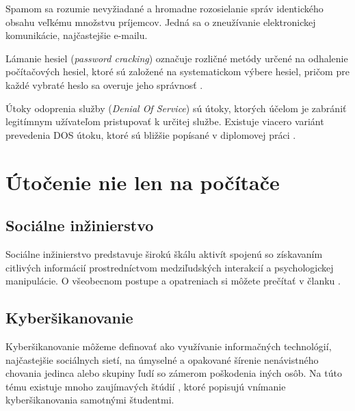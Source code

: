 \documentclass{article}
\begin{document}
Spamom \cite{wiki:Spam} sa rozumie nevyžiadané a hromadne rozosielanie správ identického obsahu veľkému množstvu príjemcov. Jedná sa o zneužívanie elektronickej komunikácie, najčastejšie e-mailu.

Lámanie hesiel (\emph{password cracking}) označuje rozličné metódy určené na odhalenie počítačových hesiel, ktoré sú  založené na systematickom výbere hesiel, pričom pre každé
vybraté heslo sa overuje jeho správnosť \cite{Hranicky2016}.

Útoky odoprenia služby (\emph{Denial Of Service}) sú útoky, ktorých účelom je zabrániť legitímnym užívateľom pristupovať k určitej službe. Existuje viacero variánt prevedenia DOS útoku, ktoré sú bližšie popísané v diplomovej práci \cite{Gerlichy2017}.

\section{Útočenie nie len na počítače}
\subsection{Sociálne inžinierstvo} 
Sociálne inžinierstvo predstavuje širokú škálu aktivít spojenú so získavaním citlivých informácií prostredníctvom medziľudských interakcií a psychologickej manipulácie. O všeobecnom postupe a opatreniach si môžete prečítať v članku \cite{SocialEngineering}.


\subsection{Kyberšikanovanie}
Kyberšikanovanie môžeme definovať \cite{CyberBullying} ako využívanie informačných technológií, najčastejšie sociálnych sietí, na úmyselné a  opakované šírenie nenávistného chovania jedinca alebo skupiny ľudí so zámerom poškodenia iných osôb.
Na túto tému existuje mnoho zaujímavých štúdií \cite{CyberBullyingStudy}, ktoré popisujú vnímanie kyberšikanovania samotnými študentmi.


\newpage

\renewcommand{\refname}{Literatúra}

\end{document}
